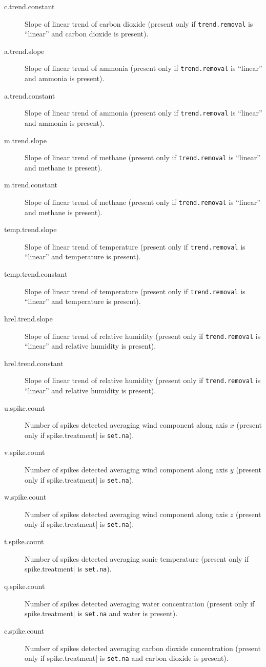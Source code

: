 \documentclass[a4paper,10pt]{book}
\begin{document}
\begin{description}
 \item[c.trend.constant] Slope of linear trend of carbon dioxide (present only if \verb|trend.removal| is ``linear'' and carbon dioxide is present).
 \item[a.trend.slope] Slope of linear trend of ammonia (present only if \verb|trend.removal| is ``linear'' and ammonia is present).
 \item[a.trend.constant] Slope of linear trend of ammonia (present only if \verb|trend.removal| is ``linear'' and ammonia is present).
 \item[m.trend.slope] Slope of linear trend of methane (present only if \verb|trend.removal| is ``linear'' and methane is present).
 \item[m.trend.constant] Slope of linear trend of methane (present only if \verb|trend.removal| is ``linear'' and methane is present).
 \item[temp.trend.slope] Slope of linear trend of temperature (present only if \verb|trend.removal| is ``linear'' and temperature is present).
 \item[temp.trend.constant] Slope of linear trend of temperature (present only if \verb|trend.removal| is ``linear'' and temperature is present).
 \item[hrel.trend.slope] Slope of linear trend of relative humidity (present only if \verb|trend.removal| is ``linear'' and relative humidity is present).
 \item[hrel.trend.constant] Slope of linear trend of relative humidity (present only if \verb|trend.removal| is ``linear'' and relative humidity is present).
\item[u.spike.count] Number of spikes detected averaging wind component along axis $x$ (present only if \verb||spike.treatment| is \verb|set.na|).
 \item[v.spike.count] Number of spikes detected averaging wind component along axis $y$ (present only if \verb||spike.treatment| is \verb|set.na|).
 \item[w.spike.count] Number of spikes detected averaging wind component along axis $z$ (present only if \verb||spike.treatment| is \verb|set.na|).
 \item[t.spike.count] Number of spikes detected averaging sonic temperature (present only if \verb||spike.treatment| is \verb|set.na|).
 \item[q.spike.count] Number of spikes detected averaging water concentration (present only if \verb||spike.treatment| is \verb|set.na| and water is present).
 \item[c.spike.count] Number of spikes detected averaging carbon dioxide concentration (present only if \verb||spike.treatment| is \verb|set.na| and carbon dioxide is present).

\end{description}
\end{document}
